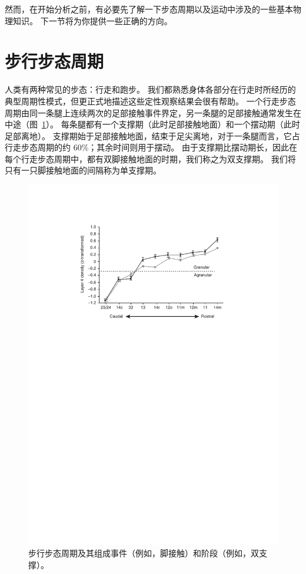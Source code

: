 然而，在开始分析之前，有必要先了解一下步态周期以及运动中涉及的一些基本物理知识。
下一节将为你提供一些正确的方向。


\section{步行步态周期}

人类有两种常见的步态：行走和跑步。
我们都熟悉身体各部分在行走时所经历的典型周期性模式，但更正式地描述这些定性观察结果会很有帮助。
一个行走步态周期由同一条腿上连续两次的足部接触事件界定，另一条腿的足部接触通常发生在中途（图~\ref{fig:2_2}）。
每条腿都有一个支撑期（此时足部接触地面）和一个摆动期（此时足部离地）。
支撑期始于足部接触地面，结束于足尖离地，对于一条腿而言，它占行走步态周期的约 60\%；其余时间则用于摆动。
由于支撑期比摆动期长，因此在每个行走步态周期中，都有双脚接触地面的时期，我们称之为双支撑期。
我们将只有一只脚接触地面的间隔称为单支撑期。


\begin{figure}[!htb]
	\centering
	\includegraphics[width=1.0\linewidth]{chap2/2_2}
	\caption{步行步态周期及其组成事件（例如，脚接触）和阶段（例如，双支撑）。 \label{fig:2_2}}
\end{figure}


